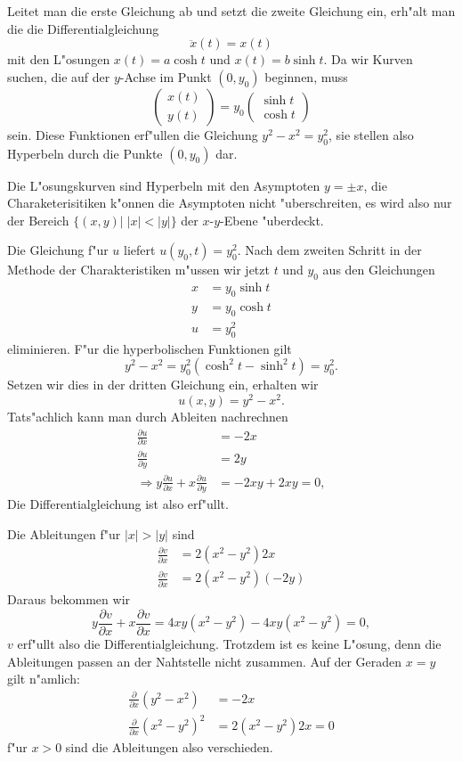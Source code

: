 \begin{loesung}
\begin{teilaufgaben}
Leitet man die erste
Gleichung ab und setzt die zweite Gleichung ein, erh"alt man die
die Differentialgleichung
\[
\ddot x(t)=x(t)
\]
mit den L"osungen $x(t)=a\cosh t$ und $x(t)=b\sinh t$.
Da wir Kurven
suchen, die auf der $y$-Achse im Punkt $(0,y_0)$ beginnen, muss
\[
\begin{pmatrix}
x(t)\\y(t)
\end{pmatrix}
=
y_0
\begin{pmatrix}
\sinh t\\
\cosh t
\end{pmatrix}
\]
sein.
Diese Funktionen erf"ullen die Gleichung $y^2-x^2=y_0^2$, sie stellen
also Hyperbeln durch die Punkte $(0,y_0)$ dar.
\item
Die L"osungskurven sind Hyperbeln mit den Asymptoten $y=\pm x$, die
Charaketerisitiken k"onnen die Asymptoten nicht "uberschreiten, es wird
also nur der Bereich $\{(x,y)|\;|x|<|y|\}$ der $x$-$y$-Ebene "uberdeckt.
\item
Die Gleichung f"ur $u$ liefert $u(y_0, t)=y_0^2$.
Nach dem zweiten Schritt in der Methode der Charakteristiken
m"ussen wir jetzt $t$ und $y_0$ aus den Gleichungen
\begin{align*}
x&=y_0\sinh t\\
y&=y_0\cosh t\\
u&=y_0^2
\end{align*}
eliminieren. F"ur die hyperbolischen Funktionen gilt
\[
y^2-x^2=y_0^2(\cosh^2t-\sinh^2t)=y_0^2.
\]
Setzen wir dies in der dritten Gleichung ein, erhalten wir
\[
u(x,y)=y^2-x^2.
\]
Tats"achlich kann man durch Ableiten nachrechnen
\begin{align*}
\frac{\partial u}{\partial x}&=-2x\\
\frac{\partial u}{\partial y}&=2y\\
\Rightarrow
y\frac{\partial u}{\partial x}+x\frac{\partial u}{\partial y}&=-2xy+2xy=0,
\end{align*}
Die Differentialgleichung ist also erf"ullt.
\item
Die Ableitungen f"ur $|x|>|y|$ sind
\begin{align*}
\frac{\partial v}{\partial x}
&=2(x^2-y^2)2x\\
\frac{\partial v}{\partial x}
&=2(x^2-y^2)(-2y)
\end{align*}
Daraus bekommen wir
\[
y\frac{\partial v}{\partial x}
+
x \frac{\partial v}{\partial x}
=
4xy(x^2-y^2)
-4xy(x^2-y^2)=0,
\]
$v$ erf"ullt also die Differentialgleichung.
Trotzdem ist es keine
L"osung, denn die Ableitungen passen an der Nahtstelle nicht zusammen.
Auf der Geraden $x=y$ gilt n"amlich:
\begin{align*}
\frac{\partial}{\partial x}(y^2-x^2)&=-2x\\
\frac{\partial}{\partial x}(x^2-y^2)^2&=2(x^2-y^2)2x=0
\end{align*}
f"ur $x>0$ sind die Ableitungen also verschieden.
\end{teilaufgaben}


\end{loesung}
